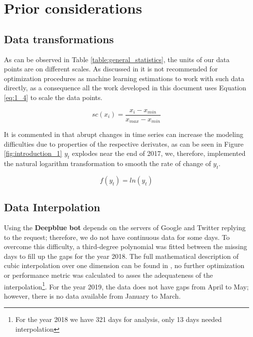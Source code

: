 
\section{Prior considerations}


\subsection{Data transformations}

As can be observed in Table \ref{table:general_statistics}, the units of our data points are on different scales. As discussed in \cite{muller2016introduction} it is not recommended for optimization procedures as machine learning estimations to work with such data directly, as a consequence  
all the work developed in this document uses Equation \ref{eq:1_4} to scale the data points.


\begin{equation}
sc(x_{i}) = \frac{x_{i}-x_{min}}{x_{max}-x_{min}}
\label{eq:1_4}
\end{equation}

It is commented in \cite{makridakis2008forecasting} that abrupt changes in time series can increase the modeling difficulties due to properties of the respective derivates, as can be seen in Figure \ref{fig:introduction_1} $y_{t}$ explodes near the end of 2017, we, therefore, implemented the natural logarithm transformation to smooth the rate of change of $y_{t}$.

\begin{equation}
f (y_{t}) = ln(y_{t})
\label{eq:1_5}
\end{equation}

\subsection{Data Interpolation}
Using the \textbf{Deepblue bot} depends on the servers of Google and Twitter replying to the request; therefore, we do not have continuous data for some days. To overcome this difficulty, a third-degree polynomial was fitted between the missing days to fill up the gaps for the year 2018. The full mathematical description of cubic interpolation over one dimension can be found in \cite{chapra1998numerical}, no further optimization or performance metric was calculated to asses the adequateness of the interpolation\footnote{ For the year 2018 we have 321 days for analysis, only 13 days needed interpolation}. For the year 2019, the data does not have gaps from April to May; however, there is no data available from January to March.


